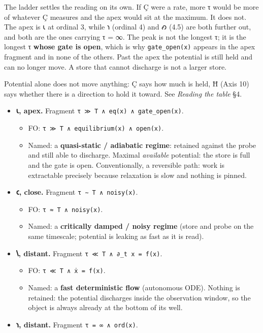 \documentclass[12pt,a4paper]{article}
\begin{document}
The ladder settles the reading on its own. If Ç were a rate, more τ
would be more of whatever Ç measures and the apex would sit at the
maximum. It does not. The apex is 𐑧 at ordinal 3, while 𐑪 (ordinal 4)
and 𐑺 (4.5) are both further out, and both are the ones carrying τ = ∞.
The peak is not the longest τ; it is the longest τ \textbf{whose gate is
open}, which is why \texttt{gate\_open(x)} appears in the apex fragment
and in none of the others. Past the apex the potential is still held and
can no longer move. A store that cannot discharge is not a larger store.

Potential alone does not move anything: Ç says how much is held, Ħ (Axis
10) says whether there is a direction to hold it toward. See
\emph{Reading the table} §4.

\begin{itemize}
\tightlist
\item
  \textbf{𐑧, apex.} Fragment
  \texttt{τ\ ≫\ T\ ∧\ eq(x)\ ∧\ gate\_open(x)}.

  \begin{itemize}
  \tightlist
  \item
    FO: \texttt{τ\ ≫\ T\ ∧\ equilibrium(x)\ ∧\ open(x)}.
  \item
    Named: a \textbf{quasi-static / adiabatic regime}: retained against
    the probe and still able to discharge. Maximal \emph{available}
    potential: the store is full and the gate is open. Conventionally, a
    reversible path: work is extractable precisely because relaxation is
    slow and nothing is pinned.
  \end{itemize}
\item
  \textbf{𐑤, close.} Fragment \texttt{τ\ ∼\ T\ ∧\ noisy(x)}.

  \begin{itemize}
  \tightlist
  \item
    FO: \texttt{τ\ ≈\ T\ ∧\ noisy(x)}.
  \item
    Named: a \textbf{critically damped / noisy regime} (store and probe
    on the same timescale; potential is leaking as fast as it is read).
  \end{itemize}
\item
  \textbf{𐑘, distant.} Fragment \texttt{τ\ ≪\ T\ ∧\ ∂\_t\ x\ =\ f(x)}.

  \begin{itemize}
  \tightlist
  \item
    FO: \texttt{τ\ ≪\ T\ ∧\ ẋ\ =\ f(x)}.
  \item
    Named: a \textbf{fast deterministic flow} (autonomous ODE). Nothing
    is retained: the potential discharges inside the observation window,
    so the object is always already at the bottom of its well.
  \end{itemize}
\item
  \textbf{𐑪, distant.} Fragment \texttt{τ\ =\ ∞\ ∧\ ord(x)}.


\end{itemize}
\end{document}
